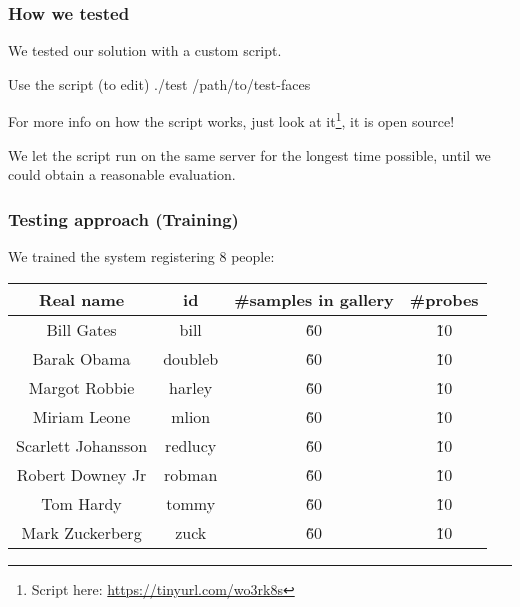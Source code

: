 \begin{frame} \frametitle{How we tested}

	We tested our solution with a custom script.
	
	\vfill

	\begin{block}{Use the script (to edit)}
		./test /path/to/test-faces
	\end{block}
	
	For more info on how the script works, just look at 
	it\footnote{Script here: 
	{\color{red} \url{https://tinyurl.com/wo3rk8s}}}, 
	it is open source!

	\vfill
	
	We let the script run on the same server for the longest
	time possible, until we could obtain a reasonable evaluation.

\end{frame}

\begin{frame} \frametitle{Testing approach (Training)}

	We trained the system registering 8 people:
	
	\begin{center}
 		\begin{tabular}{||c | c | c | c||} 
			 \hline
			 	\textbf{Real name} & 
			 	\textbf{id} & 
			 	\textbf{\#samples in gallery} & 
			 	\textbf{\#probes} 
			 \\ [0.5ex] 
			 \hline\hline
			 	Bill Gates & 
			 	bill & 
			 	\~60 & 
			 	\~10 
			 \\ 
			 \hline
			 	Barak Obama & 
			 	doubleb & 
			 	\~60 & 
			 	\~10 
			 \\
			 \hline
			 	Margot Robbie & 
				harley & 
			 	\~60 & 
			 	\~10 
			 \\
			 \hline
			 	Miriam Leone & 
			 	mlion & 
			 	\~60 & 
			 	\~10 
			 \\
			 \hline
			 	Scarlett Johansson & 
			 	redlucy & 
			 	\~60 & 
			 	\~10 
			\\
			 \hline
			 	Robert Downey Jr & 
				robman & 
			 	\~60 & 
			 	\~10 
			 \\
			 \hline
			 	Tom Hardy & 
			 	tommy & 
			 	\~60 & 
			 	\~10
			\\
			 \hline
			 	Mark Zuckerberg & 
			 	zuck & 
			 	\~60 & 
			 	\~10
			\\ [1ex] 
 			\hline
		\end{tabular}
	\end{center}	

\end{frame}

